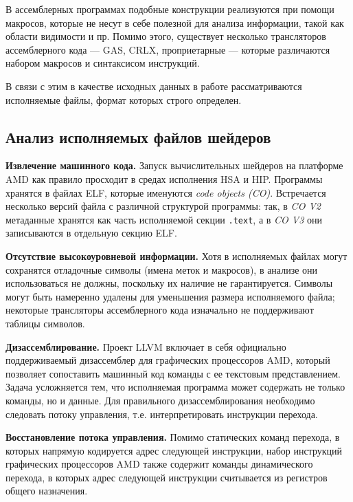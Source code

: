 \documentclass[a4paper,14pt]{extarticle}
\newcommand{\topic}[2]{\textbf{#1.} #2\newline}
\begin{document}
В ассемблерных программах подобные конструкции реализуются при помощи макросов,
которые не несут в себе полезной для анализа информации, такой как области видимости и пр.
Помимо этого, существует несколько трансляторов ассемблерного кода — GAS, CRLX, проприетарные — которые
различаются набором макросов и синтаксисом инструкций.

В связи с этим в качестве исходных данных в работе рассматриваются исполняемые файлы,
формат которых строго определен.

\subsection{Анализ исполняемых файлов шейдеров}

\topic{Извлечение машинного кода}{Запуск вычислительных шейдеров на платформе AMD как правило просходит
в средах исполнения HSA и HIP. Программы хранятся в файлах ELF, которые именуются \textit{code objects (CO)}.
Встречается несколько версий файла с различной структурой программы: так,
в \textit{CO V2} метаданные хранятся как часть исполняемой секции \texttt{.text}, а
в \textit{CO V3} они записываются в отдельную секцию ELF.}

\topic{Отсутствие высокоуровневой информации}{Хотя в исполняемых файлах могут сохранятся отладочные символы
(имена меток и макросов), в анализе они использоваться не должны, поскольку их наличие не гарантируется.
Символы могут быть намеренно удалены для уменьшения размера исполняемого файла;
некоторые трансляторы ассемблерного кода изначально не поддерживают таблицы символов.}

\topic{Дизассемблирование}{Проект LLVM включает в себя официально поддерживаемый дизассемблер
для графических процессоров AMD, который позволяет сопоставить машинный код команды с ее текстовым
представлением. Задача усложняется тем, что исполняемая программа может содержать не только команды,
но и данные. Для правильного дизассемблирования необходимо следовать потоку управления,
т.е. интерпретировать инструкции перехода.}

\topic{Восстановление потока управления}{Помимо статических команд перехода, в которых напрямую
кодируется адрес следующей инструкции, набор инструкций графических процессоров AMD также содержит
команды динамического перехода, в которых адрес следующей инструкции считывается из регистров
общего назначения.}

\printbibliography[title={Список источников}]
\end{document}

